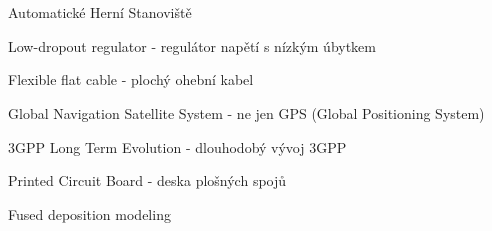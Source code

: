 \cleardoublepage
\chapter*{\listofabbrevname}
{}

\begin{acronym}[KolikMista]

		{Automatické Herní Stanoviště}

		{Low-dropout regulator - regulátor napětí s nízkým úbytkem}

		{Flexible flat cable - plochý ohební kabel}					%

		{Global Navigation Satellite System - ne jen GPS (Global Positioning System)}
	
		{3GPP Long Term Evolution - dlouhodobý vývoj 3GPP}

		{Printed Circuit Board - deska plošných spojů}    %

	{Fused deposition modeling}%

\end{acronym}
